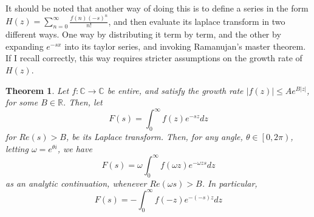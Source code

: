 \documentclass{article}
\newtheorem{theorem}{Theorem}
\begin{document}
	It should be noted that another way of doing this is to define a series in the form $ H(z) = \sum_{n=0}^{\infty} \frac{f(n) (-s)^n}{n!} $, and then evaluate its laplace transform in two different ways. One way by distributing it term by term, and the other by expanding $e^{-sx}$ into its taylor series, and invoking Ramanujan's master theorem. If I recall correctly, this way requires stricter assumptions on the growth rate of $H(z)$. 
	
	\begin{theorem} \label{laplace_analytic_continuation}
		Let $f : \mathbb{C} \rightarrow \mathbb{C}$ be entire, and satisfy the growth rate $|f(z)| \leq A e^{B |z|}$, for some $B \in \mathbb{R}$. Then, let $$F(s) = \int_{0}^{\infty} f(z) e^{-sz} dz$$ for $Re(s) > B$, be its Laplace transform. Then, for any angle, $\theta \in \left[0, 2 \pi \right)$, letting $\omega = e^{\theta i}$, we have $$ F(s) = \omega \int_{0}^{\infty} f(\omega z) e^{-\omega z s} dz $$ as an analytic continuation, whenever $Re(\omega s) > B$. In particular, $$ F(s) = -\int_{0}^{\infty} f(-z) e^{-(-s)z} dz $$
	\end{theorem}
\end{document}

